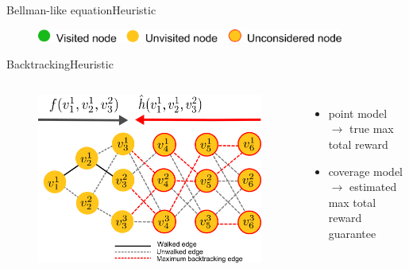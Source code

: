 \begin{frame}{Bellman-like equation}{Heuristic}
\begin{figure}
\centering
\includegraphics[width = 0.9\textwidth]{./figure/DefineFuncHelp}
\end{figure}

\end{frame}

\begin{frame}{Backtracking}{Heuristic}

\begin{columns}

\begin{minipage}{\textwidth}
\begin{figure}
\centering
\includegraphics[width = \textwidth]{./figure/backtracking}
\end{figure}
\end{minipage}

\begin{minipage}{\textwidth}
\begin{itemize}
\item point model $ \rightarrow $ true max total reward
\item coverage model $ \rightarrow $ estimated max total reward guarantee
\end{itemize}
\end{minipage}

\end{columns}

\end{frame}

